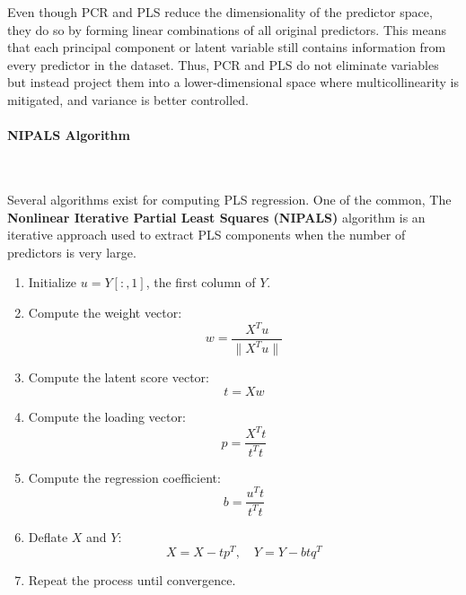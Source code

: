 \documentclass[11pt,twoside,a4paper]{article}
\begin{document}
Even though PCR and PLS reduce the dimensionality of the predictor space, they do so by forming linear combinations of all original predictors. This means that each principal component or latent variable still contains information from every predictor in the dataset. Thus, PCR and PLS do not eliminate variables but instead project them into a lower-dimensional space where multicollinearity is mitigated, and variance is better controlled.

\paragraph {NIPALS Algorithm} \ \

Several algorithms exist for computing PLS regression. One of the common, The \textbf{Nonlinear Iterative Partial Least Squares (NIPALS)} algorithm is an iterative approach used to extract PLS components when the number of predictors is very large.

\begin{enumerate}
    \item Initialize \( u = Y[:,1] \), the first column of \( Y \).
    \item Compute the weight vector:
        \begin{equation}
        w = \frac{X^T u}{\|X^T u\|}
        \end{equation}
    \item Compute the latent score vector:
        \begin{equation}
        t = Xw
        \end{equation}
    \item Compute the loading vector:
        \begin{equation}
        p = \frac{X^T t}{t^T t}
        \end{equation}
    \item Compute the regression coefficient:
        \begin{equation}
        b = \frac{u^T t}{t^T t}
        \end{equation}
    \item Deflate \( X \) and \( Y \):
        \begin{equation}
        X = X - tp^T, \quad Y = Y - btq^T
        \end{equation}
    \item Repeat the process until convergence.
\end{enumerate}
\end{document}

